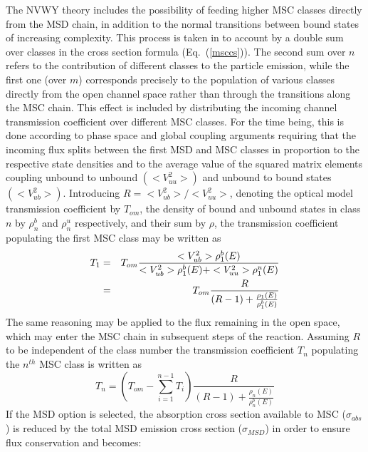 The NVWY%
 theory includes the possibility of feeding higher MSC classes
directly from the MSD%
 chain, in addition to the normal transitions between bound
states of increasing complexity. This process is taken in to account by a
double sum over classes in the cross section formula (Eq.~(\ref{msccs})). The
second sum over $n$ refers to the contribution of different classes to the
particle emission, while the first one (over $m$) corresponds precisely to
the population of various classes directly from the open channel space
rather than through the transitions along the MSC chain. This effect is
included
by distributing the incoming channel transmission coefficient over different
MSC%
 classes. For the time being, this is done according to phase space
and global coupling arguments requiring that the incoming flux splits
between the first MSD%
 and MSC classes in proportion to the respective state densities
and to the average value of the squared matrix elements coupling unbound to
unbound $(<V_{uu}^{2}>)$ and unbound to bound states $(<V_{ub}^{2}>)$.
Introducing $R=<V_{ub}^{2}>/<V_{uu}^{2}>$, denoting the optical model
transmission coefficient by $T_{om}$, the density of bound and unbound
states in class $n$ by $\rho_{n}^{b}$ and $\rho_{n}^{u}$ respectively, and
their sum by $\rho$, the transmission coefficient populating the first MSC%
 class may be written as
\begin{eqnarray}
T_{1}&=&T_{om}%
\frac{<V_{ub}^{2}>\rho_{1}^{b}(E)}{<V_{ub}^{2}>\rho_{1}^{b}(E)+<V_{uu}^{2}>%
\rho_{1}^{u}(E)}  \notag \\
&=&T_{om}\frac{R}{(R-1)+\frac{\rho_{1}(E)}{\rho_{1}^{b}(E)}}  \label{eq9}
\end{eqnarray}
The same reasoning may be applied to the flux remaining in the open space,
which may enter the MSC%
 chain in subsequent steps of the reaction. Assuming $R$ to be
independent of the class number the transmission coefficient $T_{n}$
populating the $n^{th}$ MSC class is written as
\begin{equation}
T_{n}=\left(T_{om}-\sum_{i=1}^{n-1}T_{i}\right)%
\frac{R}{(R-1)+\frac{\rho_{n}(E)}{\rho_{n}^{b}(E)}}  \label{eq10}
\end{equation}
If the MSD%
 option is selected, the absorption cross section available to MSC
($\sigma_{abs}$) is reduced by the total MSD emission cross section ($%
\sigma_{MSD}$) in order to ensure flux conservation and becomes:
